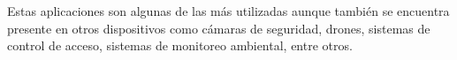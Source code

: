 \documentclass[12pt, letterpaper]{article}
\begin{document}
	Estas aplicaciones son algunas de las más utilizadas aunque también se encuentra presente en otros dispositivos como cámaras de seguridad, drones, sistemas de control de acceso, sistemas de monitoreo ambiental, entre otros.






\end{document}
